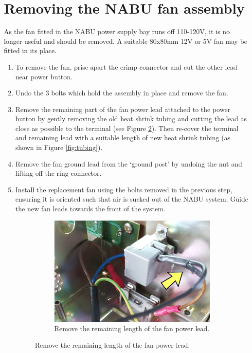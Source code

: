 \section{Removing the NABU fan assembly}
As the fan fitted in the NABU power supply bay runs off 110-120V, it is no longer useful and should be removed. A suitable 80x80mm 12V or 5V fan may be fitted in its place.
\begin{enumerate}
	\item  To remove the fan, prise apart the crimp connector and cut the other lead near power button.
	\item Undo the 3 bolts which hold the assembly in place and remove the fan.
	\item Remove the remaining part of the fan power lead attached to the power button by gently removing the old heat shrink tubing and cutting the lead as close as possible to the terminal (see Figure \ref{fig:fan}). Then re-cover the terminal and remaining lead with a suitable length of new heat shrink tubing (as shown in Figure \ref{fig:tubing}).
	\item Remove the fan ground lead from the `ground post' by undoing the nut and lifting off the ring connector.
	\item Install the replacement fan using the bolts removed in the previous step, ensuring it is oriented such that air is sucked out of the NABU system. Guide the new fan leads towards the front of the system.
	\begin{figure}[h!]
		\begin{subfigure}[b]{\columnwidth}
			\includegraphics[width=\columnwidth]{images/psu-image-1a.jpg}
			\caption{Remove the remaining length of the fan power lead.}
			\label{fig:fan}
		\end{subfigure}

\end{figure}
\end{enumerate}
